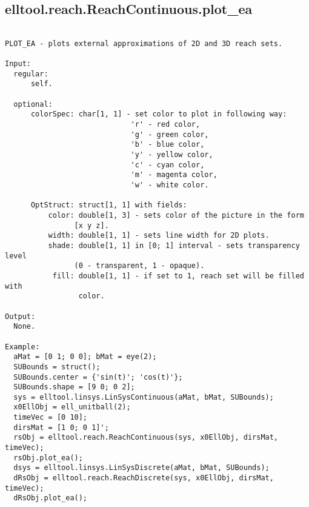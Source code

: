 \subsection{\texorpdfstring{elltool.reach.ReachContinuous.plot\_ea}{plot\_ea}}\label{method:elltool.reach.ReachContinuous.plotea}
\begin{verbatim}

PLOT_EA - plots external approximations of 2D and 3D reach sets.

Input:
  regular:
      self.

  optional:
      colorSpec: char[1, 1] - set color to plot in following way:
                             'r' - red color,
                             'g' - green color,
                             'b' - blue color,
                             'y' - yellow color,
                             'c' - cyan color,
                             'm' - magenta color,
                             'w' - white color.

      OptStruct: struct[1, 1] with fields:
          color: double[1, 3] - sets color of the picture in the form
                [x y z].
          width: double[1, 1] - sets line width for 2D plots.
          shade: double[1, 1] in [0; 1] interval - sets transparency level
                (0 - transparent, 1 - opaque).
           fill: double[1, 1] - if set to 1, reach set will be filled with
                 color.

Output:
  None.

Example:
  aMat = [0 1; 0 0]; bMat = eye(2);
  SUBounds = struct();
  SUBounds.center = {'sin(t)'; 'cos(t)'};
  SUBounds.shape = [9 0; 0 2];
  sys = elltool.linsys.LinSysContinuous(aMat, bMat, SUBounds);
  x0EllObj = ell_unitball(2);
  timeVec = [0 10];
  dirsMat = [1 0; 0 1]';
  rsObj = elltool.reach.ReachContinuous(sys, x0EllObj, dirsMat, timeVec);
  rsObj.plot_ea();
  dsys = elltool.linsys.LinSysDiscrete(aMat, bMat, SUBounds);
  dRsObj = elltool.reach.ReachDiscrete(sys, x0EllObj, dirsMat, timeVec);
  dRsObj.plot_ea();
\end{verbatim}
